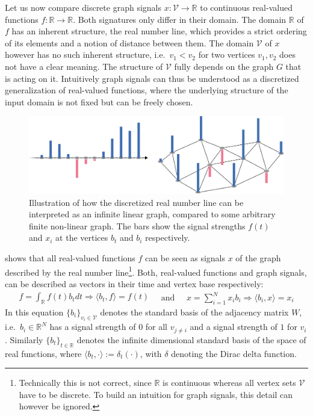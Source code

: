 Let us now compare discrete graph signals $x: \mathcal{V} \to \mathbb{R}$ to continuous real-valued functions $f: \mathbb{R} \to \mathbb{R}$.
Both signatures only differ in their domain.
The domain $\mathbb{R}$ of $f$ has an inherent structure, the real number line, which provides a strict ordering of its elements and a notion of distance between them.
The domain $\mathcal{V}$ of $x$ however has no such inherent structure, i.e.\  $v_1 < v_2$ for two vertices $v_1, v_2$ does not have a clear meaning.
The structure of $\mathcal{V}$ fully depends on the graph $G$ that is acting on it.
Intuitively graph signals can thus be understood as a discretized generalization of real-valued functions, where the underlying structure of the input domain is not fixed but can be freely chosen.
\begin{figure}[ht]
	\centering
	\includegraphics[width=0.8\linewidth]{gfx/sgt/real-graph.pdf}
	\caption{%
		Illustration of how the discretized real number line can be interpreted as an infinite linear graph, compared to some arbitrary finite non-linear graph.
		The bars show the signal strengths $f(t)$ and $x_i$ at the vertices $b_t$ and $b_i$ respectively.
	}\label{fig:sgt:realGraph}
\end{figure}

 shows that all real-valued functions $f$ can be seen as signals $x$ of the graph described by the real number line\footnote{%
	Technically this is not correct, since $\mathbb{R}$ is continuous whereas all vertex sets $\mathcal{V}$ have to be discrete.
	To build an intuition for graph signals, this detail can however be ignored.
}.
Both, real-valued functions and graph signals, can be described as vectors in their time and vertex base respectively:
\begin{equation*}
	\begin{split}
		f = \int_{\mathbb{R}} f(t) b_t dt
		\Rightarrow \langle b_t, f \rangle = f(t)
	\end{split}
	\quad\text{and}\quad
	\begin{split}
		x = \sum_{i = 1}^{N} x_i b_i
		\Rightarrow \langle b_i, x \rangle = x_i
	\end{split}
\end{equation*}
In this equation ${\{ b_i \}}_{v_i \in \mathcal{V}}$ denotes the standard basis of the adjacency matrix $W$, i.e.\ $b_i \in \mathbb{R}^N$ has a signal strength of $0$ for all $v_{j \neq i}$ and a signal strength of $1$ for $v_i$.
Similarly ${\{ b_t \}}_{t \in \mathbb{R}}$ denotes the infinite dimensional standard basis of the space of real functions, where $\langle b_t, \cdot \rangle := \delta_t(\cdot)$, with $\delta$ denoting the Dirac delta function.

